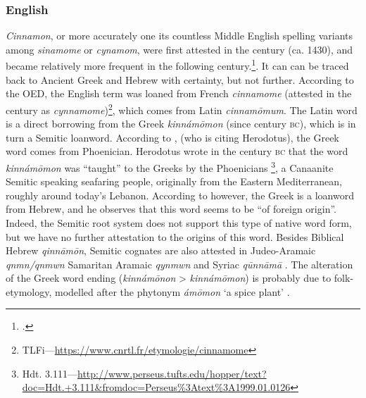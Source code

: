 
\subsubsection{English}
\label{sec:cinnamon_names_en}



\textit{Cinnamon}, or more accurately one its countless Middle English spelling variants among \textit{sinamome} or \textit{cynamom}, were first attested in the  century (ca. 1430), and became relatively more frequent in the following  century.\footcite[s.v. cinnamon]{oed}. It can can be traced back to Ancient Greek and Hebrew with certainty, but not further. According to the \gls{OED}, the English term was loaned from French \textit{cinnamome} (attested in the  century as \textit{cynnamome})\footnote{\gls{TLFi}---\url{https://www.cnrtl.fr/etymologie/cinnamome}}, which comes from Latin \textit{cinnamōmum}. The Latin word is a direct borrowing from the Greek  \textit{kinnámōmon} (since  century \textsc{bc}), which is in turn a Semitic loanword. According to \textcite[701]{beekes_etymological_2010}, (who is citing Herodotus), the Greek word comes from Phoenician. Herodotus wrote in the  century \textsc{bc} that the word \textit{kinnámōmon} was ``taught'' to the Greeks by the Phoenicians \autocite[139]{herodotus_herodotus_1921}\footnote{Hdt. 3.111---\url{http://www.perseus.tufts.edu/hopper/text?doc=Hdt.+3.111&fromdoc=Perseus\%3Atext\%3A1999.01.0126}}, a Canaanite Semitic speaking seafaring people, originally from the Eastern Mediterranean, roughly around today’s Lebanon. According to \textcite[585]{klein_comprehensive_1987} however, the Greek is a loanword from Hebrew, and he observes that this word seems to be ``of foreign origin''. Indeed, the Semitic root system does not support this type of native word form, but we have no further attestation to the origins of this word. Besides Biblical Hebrew 
\textit{qinnāmōn}, Semitic cognates are also attested in Judeo-Aramaic \textit{qnmn/qnmwn} Samaritan Aramaic \textit{qynmwn} and Syriac \textit{qūnnāmā} \autocite{rosol_early_2018}. The alteration of the Greek word ending (\textit{kinnámōnon} > \textit{kinnámōmon}) is probably due to folk-etymology, modelled after the \gls{phytonym}  \textit{ámōmon} `a spice plant' \autocites{beekes_etymological_2010, klein_comprehensive_1987}. 
    
